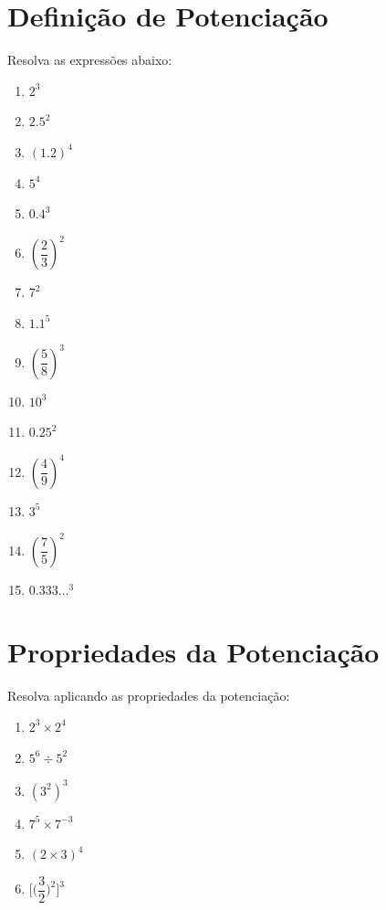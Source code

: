\documentclass[a4paper,12pt]{article}
\begin{document}
	
	\begin{multicols}{2}
		
		\section*{Definição de Potenciação} \vspace{-5mm}
		Resolva as expressões abaixo: \vspace{-4mm}
		\begin{multicols}{3}
		\begin{enumerate}[label=\roman*.]
			\item $2^3$ \item  $2.5^2$ \item $(1.2)^4$
			\item $5^4$ \item $0.4^3$ \item $\left(\dfrac{2}{3}\right)^2$
			\item $7^2$ \item $1.1^5$ \item $\left(\dfrac{5}{8}\right)^3$
			\item $10^3$ \item $0.25^2$ \item $\left(\dfrac{4}{9}\right)^4$
			\item $3^5$  \item $\left(\dfrac{7}{5}\right)^2$ \item $0.333\ldots^3$ 
		\end{enumerate}
		\end{multicols}
	
		\section*{Propriedades da Potenciação} \vspace{-5mm}
		Resolva aplicando as propriedades da potenciação: \vspace{-4mm}
		\begin{multicols}{2}
		\begin{enumerate}[label=\roman*.]
			\item $2^3 \times 2^4$
			\item $5^6 \div 5^2$
			\item $(3^2)^3$
			\item $7^5 \times 7^{-3}$
			\item $(2 \times 3)^4$
			\item $ \Bigg[ \bigg( \dfrac{3}{2} \bigg)^{2} \Bigg] ^{3}$
		\end{enumerate}
		\end{multicols}
		

\end{multicols}
\end{document}
